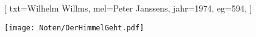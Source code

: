 [
    txt={Wilhelm Willms},
    mel={Peter Janssens},
    jahr={1974},
    eg={594},
]

\texttt{[image: Noten/DerHimmelGeht.pdf]}

\endsong

\beginscripture{}~\\
\endscripture
